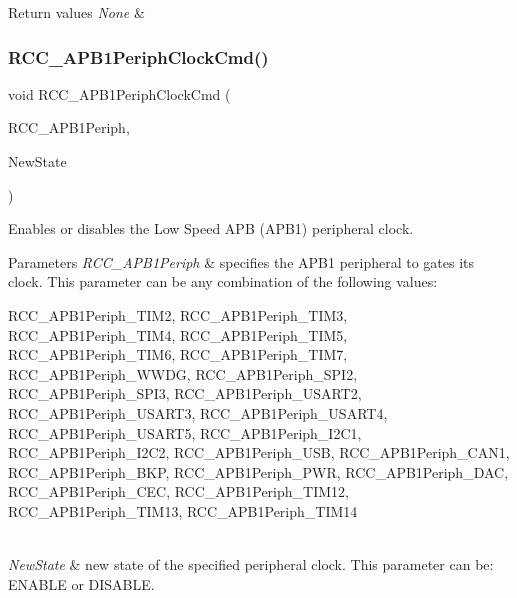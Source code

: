 \begin{DoxyRetVals}{Return values}
{\em None} & \\
\hline
\end{DoxyRetVals}
\mbox{\label{group___r_c_c___exported___functions_gaee7cc5d73af7fe1986fceff8afd3973e}} 
\subsubsection{\texorpdfstring{RCC\_APB1PeriphClockCmd()}{RCC\_APB1PeriphClockCmd()}}
{\footnotesize\ttfamily void R\+C\+C\+\_\+\+A\+P\+B1\+Periph\+Clock\+Cmd (\begin{DoxyParamCaption}\item[{uint32\+\_\+t}]{R\+C\+C\+\_\+\+A\+P\+B1\+Periph,  }\item[{\mbox{\hyperlink{group___exported__types_gac9a7e9a35d2513ec15c3b537aaa4fba1}{Functional\+State}}}]{New\+State }\end{DoxyParamCaption})}



Enables or disables the Low Speed A\+PB (A\+P\+B1) peripheral clock. 


\begin{DoxyParams}{Parameters}
{\em R\+C\+C\+\_\+\+A\+P\+B1\+Periph} & specifies the A\+P\+B1 peripheral to gates its clock. This parameter can be any combination of the following values\+: \begin{DoxyItemize}
\item R\+C\+C\+\_\+\+A\+P\+B1\+Periph\+\_\+\+T\+I\+M2, R\+C\+C\+\_\+\+A\+P\+B1\+Periph\+\_\+\+T\+I\+M3, R\+C\+C\+\_\+\+A\+P\+B1\+Periph\+\_\+\+T\+I\+M4, R\+C\+C\+\_\+\+A\+P\+B1\+Periph\+\_\+\+T\+I\+M5, R\+C\+C\+\_\+\+A\+P\+B1\+Periph\+\_\+\+T\+I\+M6, R\+C\+C\+\_\+\+A\+P\+B1\+Periph\+\_\+\+T\+I\+M7, R\+C\+C\+\_\+\+A\+P\+B1\+Periph\+\_\+\+W\+W\+DG, R\+C\+C\+\_\+\+A\+P\+B1\+Periph\+\_\+\+S\+P\+I2, R\+C\+C\+\_\+\+A\+P\+B1\+Periph\+\_\+\+S\+P\+I3, R\+C\+C\+\_\+\+A\+P\+B1\+Periph\+\_\+\+U\+S\+A\+R\+T2, R\+C\+C\+\_\+\+A\+P\+B1\+Periph\+\_\+\+U\+S\+A\+R\+T3, R\+C\+C\+\_\+\+A\+P\+B1\+Periph\+\_\+\+U\+S\+A\+R\+T4, R\+C\+C\+\_\+\+A\+P\+B1\+Periph\+\_\+\+U\+S\+A\+R\+T5, R\+C\+C\+\_\+\+A\+P\+B1\+Periph\+\_\+\+I2\+C1, R\+C\+C\+\_\+\+A\+P\+B1\+Periph\+\_\+\+I2\+C2, R\+C\+C\+\_\+\+A\+P\+B1\+Periph\+\_\+\+U\+SB, R\+C\+C\+\_\+\+A\+P\+B1\+Periph\+\_\+\+C\+A\+N1, R\+C\+C\+\_\+\+A\+P\+B1\+Periph\+\_\+\+B\+KP, R\+C\+C\+\_\+\+A\+P\+B1\+Periph\+\_\+\+P\+WR, R\+C\+C\+\_\+\+A\+P\+B1\+Periph\+\_\+\+D\+AC, R\+C\+C\+\_\+\+A\+P\+B1\+Periph\+\_\+\+C\+EC, R\+C\+C\+\_\+\+A\+P\+B1\+Periph\+\_\+\+T\+I\+M12, R\+C\+C\+\_\+\+A\+P\+B1\+Periph\+\_\+\+T\+I\+M13, R\+C\+C\+\_\+\+A\+P\+B1\+Periph\+\_\+\+T\+I\+M14 \end{DoxyItemize}
\\
\hline
{\em New\+State} & new state of the specified peripheral clock. This parameter can be\+: E\+N\+A\+B\+LE or D\+I\+S\+A\+B\+LE. \\
\hline
\end{DoxyParams}

